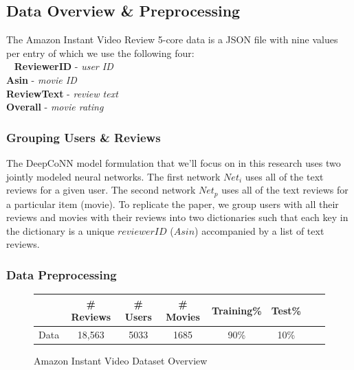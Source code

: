 \documentclass[10pt,twocolumn,letterpaper]{article}
\begin{document}
\subsection{Data Overview \& Preprocessing}
The Amazon Instant Video Review 5-core data is a JSON file with nine values per entry of which we use the following four:\\
\ \newline
 \hspace*{10mm}  \textbf{ReviewerID} - \textit{user ID} \\ 
 \hspace*{10mm}  \textbf{Asin} - \textit{movie ID} \\
 \hspace*{10mm}  \textbf{ReviewText} - \textit{review text} \\
 \hspace*{10mm}  \textbf{Overall} - \textit{movie rating} 

\subsubsection{Grouping Users \& Reviews}
The DeepCoNN model formulation that we'll focus on in this research uses two jointly modeled neural networks. The first network $Net_{i}$ uses all of the text reviews for a given user. The second network $Net_{p}$ uses all of the text reviews for a particular item (movie). To replicate the paper, we group users with all their reviews and movies with their reviews into two dictionaries such that each key in the dictionary is a unique $reviewerID$ ($Asin$) accompanied by a list of text reviews. 

\subsubsection{Data Preprocessing}
\begin{figure}[!ht]
\begin{center}
{\small
\begin{tabular}{l|ccccccc}
\hline
 & \# Reviews & \# Users & \# Movies & Training\% & Test\% \\
\hline
Data & 18,563  & 5033 & 1685 & 90\% & 10\%  \\
\hline
\end{tabular}
}
\end{center}
\caption{Amazon Instant Video Dataset Overview}
\end{figure}
\end{document}
